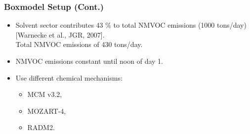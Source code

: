 \begin{frame}
    \frametitle{Boxmodel Setup (Cont.)}

    \vspace{-5mm}
    \begin{itemize}
        \item Solvent sector contributes 43 \% to total NMVOC emissions (1000 tons/day) [Warnecke et al., JGR, 2007]. \\ Total NMVOC emissions of 430 tons/day. \vspace{3mm}
        \item NMVOC emissions constant until noon of day 1.\vspace{3mm}
        \item Use different chemical mechanisms:
            \begin{itemize}
                \item MCM v3.2,
                \item MOZART-4,
                \item RADM2.
            \end{itemize}
    \end{itemize}
\end{frame}

{
    \begin{frame}[plain]
    \end{frame}
}

